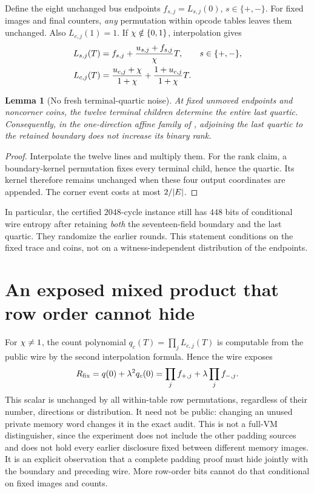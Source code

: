 \documentclass[11pt]{article}
\newtheorem{lemma}{Lemma}
\begin{document}
Define the eight unchanged bus endpoints $f_{s,j}=L_{s,j}(0)$, $s\in\{+,-\}$. For fixed images and final counters, \emph{any} permutation within opcode tables leaves them unchanged. Also $L_{c,j}(1)=1$. If $\chi\notin\{0,1\}$, interpolation gives
\[
\begin{aligned}
 L_{s,j}(T)&=f_{s,j}+\frac{u_{s,j}+f_{s,j}}{\chi} T,
 &&s\in\{+,-\},\\
 L_{c,j}(T)&=\frac{u_{c,j}+\chi}{1+\chi}
             +\frac{1+u_{c,j}}{1+\chi}T.
\end{aligned}
\]

\begin{lemma}[No fresh terminal-quartic noise]
At fixed unmoved endpoints and noncorner coins, the twelve terminal children determine the entire last quartic. Consequently, in the one-direction affine family of , adjoining the last quartic to the retained boundary does not increase its binary rank.
\end{lemma}
\begin{proof}
Interpolate the twelve lines and multiply them. For the rank claim, a boundary-kernel permutation fixes every terminal child, hence the quartic. Its kernel therefore remains unchanged when these four output coordinates are appended. The corner event costs at most $2/|E|$.
\end{proof}

In particular, the certified $2048$-cycle instance still has $448$ bits of conditional wire entropy after retaining \emph{both} the seventeen-field boundary and the last quartic. They randomize the earlier rounds. This statement conditions on the fixed trace and coins, not on a witness-independent distribution of the endpoints.

\section{An exposed mixed product that row order cannot hide}

For $\chi\ne1$, the count polynomial $q_c(T)=\prod_j L_{c,j}(T)$ is computable from the public wire by the second interpolation formula. Hence the wire exposes
\[
 R_{\rm fix}=q(0)+\lambda^2q_c(0)
       =\prod_j f_{+,j}+\lambda\prod_j f_{-,j}.
\]
This scalar is unchanged by all within-table row permutations, regardless of their number, directions or distribution. It need not be public: changing an unused private memory word changes it in the exact audit. This is not a full-VM distinguisher, since the experiment does not include the other padding sources and does not hold every earlier disclosure fixed between different memory images. It is an explicit observation that a complete padding proof must hide jointly with the boundary and preceding wire. More row-order bits cannot do that conditional on fixed images and counts.
\end{document}

